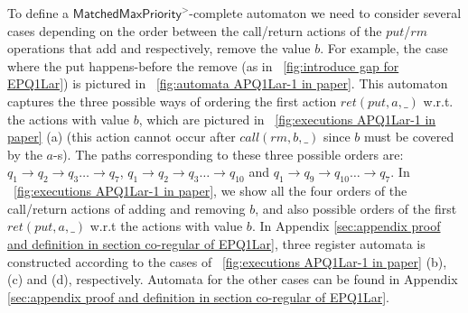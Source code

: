 To define a $\mathsf{MatchedMaxPriority}^>$-complete automaton we need to consider several cases depending on the order between the call/return actions of the $\textit{put}$/$\textit{rm}$ operations that add and respectively, remove the value $b$. For example, the case where the put happens-before the remove (as in \figurename~\ref{fig:introduce gap for EPQ1Lar}) is pictured in \figurename~\ref{fig:automata APQ1Lar-1 in paper}. {\color {red}This automaton captures the three possible ways of ordering the first action $\textit{ret}(\textit{put},a,\_)$ w.r.t. the actions with value $b$, which are pictured in \figurename~\ref{fig:executions APQ1Lar-1 in paper} (a)} (this action cannot occur after $\textit{call}(\textit{rm},b,\_)$ since $b$ must be covered by the $a$-s). The paths corresponding to these three possible orders are: $q_1 \rightarrow q_2 \rightarrow q_3 \ldots \rightarrow q_7$, $q_1 \rightarrow q_2 \rightarrow q_3 \ldots \rightarrow q_{10}$ and $q_1 \rightarrow q_9 \rightarrow q_{10} \ldots \rightarrow q_7$. {\color {red}In \figurename~\ref{fig:executions APQ1Lar-1 in paper}, we show all the four orders of the call/return actions of adding and removing $b$, and also possible orders of the first $\textit{ret}(\textit{put},a,\_)$ w.r.t the actions with value $b$. In Appendix \ref{sec:appendix proof and definition in section co-regular of EPQ1Lar}, three register automata is constructed according to the cases of \figurename~\ref{fig:executions APQ1Lar-1 in paper} (b), (c) and (d), respectively.}
{\color {blue}Automata for the other cases can be found in Appendix \ref{sec:appendix proof and definition in section co-regular of EPQ1Lar}.}


